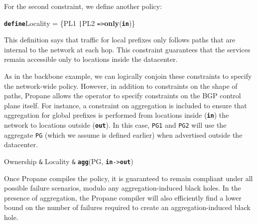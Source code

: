 \documentclass[10pt]{sigalternate052015}
\newcommand{\sysname}{{\small \sf Propane}\xspace}
\newcommand{\CD}[1]{\texttt{\small #1}}  %
\newcommand{\KW}[1]{\texttt{\small\bfseries{#1}}}
\newcommand{\Define}{\KW{define}}
\newcommand{\Path}{\texttt{=>}}
\newcommand{\Link}{\texttt{->}}
\newcommand{\Agg}{\KW{agg}}
\newcommand{\Any}{\KW{any}}
\newcommand{\In}{\KW{in}}
\newcommand{\Out}{\KW{out}}
\newcommand{\AND}{\texttt{\&}}
\newcommand{\OR}{\texttt{|}}
\newcommand{\NOT}{\texttt{!}}
\renewcommand{\path}[2]{ #1 \mapsto \ensuremath{#2} }
\begin{document}
For the second constraint, we define another policy:

\begin{code}
\Define Locality =
    \{PL1 \OR PL2 \Path \textbf{only}(\In)\}
\end{code}
\noindent
This definition says that traffic for local
prefixes only follows paths that are internal to the network at each hop.
This constraint guarantees that the services remain accessible only to locations
inside the datacenter.

As in the backbone example, we can logically conjoin these constraints
to specify the network-wide policy.
However, in addition to constraints on the shape of paths,
\sysname allows the operator to specify constraints on the BGP control plane itself.
For instance, a constraint on aggregation is included to ensure that
aggregation for global prefixes is performed from
locations inside (\In) the network to locations outside (\Out).
In this case, \CD{PG1} and \CD{PG2} will use the aggregate \CD{PG}
(which we assume is defined earlier)
when advertised outside the datacenter.

\begin{code}
Ownership \AND{} Locality \AND{} \Agg(PG, \In \Link \Out)
\end{code}

Once \sysname compiles the policy, it is guaranteed to remain compliant under all possible failure scenarios, modulo any aggregation-induced black holes. In the presence of aggregation, the \sysname compiler will also efficiently find a lower bound on the number of failures required to create an aggregation-induced black hole.
\end{document}
